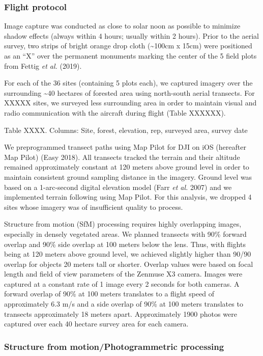 \documentclass[]{article}
\begin{document}
\subsubsection{Flight protocol}\label{flight-protocol}

Image capture was conducted as close to solar noon as possible to
minimize shadow effects (always within 4 hours; usually within 2 hours).
Prior to the aerial survey, two strips of bright orange drop cloth
(\textasciitilde{}100cm x 15cm) were positioned as an ``X'' over the
permanent monuments marking the center of the 5 field plots from Fettig
\emph{et al.} (2019).

For each of the 36 sites (containing 5 plots each), we captured imagery
over the surrounding \textasciitilde{}40 hectares of forested area using
north-south aerial transects. For XXXXX sites, we surveyed less
surrounding area in order to maintain visual and radio communication
with the aircraft during flight (Table XXXXXX).

Table XXXX. Columns: Site, forest, elevation, rep, surveyed area, survey
date

We preprogrammed transect paths using Map Pilot for DJI on iOS
(hereafter Map Pilot) (Easy 2018). All transects tracked the terrain and
their altitude remained approximately constant at 120 meters above
ground level in order to maintain consistent ground sampling distance in
the imagery. Ground level was based on a 1-arc-second digital elevation
model (Farr \emph{et al.} 2007) and we implemented terrain following
using Map Pilot. For this analysis, we dropped 4 sites whose imagery was
of insufficient quality to process.

Structure from motion (SfM) processing requires highly overlapping
images, especially in densely vegetated areas. We planned transects with
90\% forward overlap and 90\% side overlap at 100 meters below the lens.
Thus, with flights being at 120 meters above ground level, we achieved
slightly higher than 90/90 overlap for objects 20 meters tall or
shorter. Overlap values were based on focal length and field of view
parameters of the Zenmuse X3 camera. Images were captured at a constant
rate of 1 image every 2 seconds for both cameras. A forward overlap of
90\% at 100 meters translates to a flight speed of approximately 6.3 m/s
and a side overlap of 90\% at 100 meters translates to transects
approximately 18 meters apart. Approximately 1900 photos were captured
over each 40 hectare survey area for each camera.

\subsubsection{Structure from motion/Photogrammetric
processing}\label{structure-from-motionphotogrammetric-processing}
\end{document}
